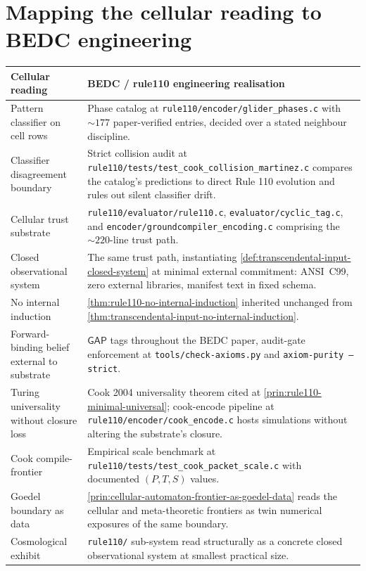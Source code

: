 \section{Mapping the cellular reading to BEDC engineering}
\label{sec:cellular-automaton-reading-mapping-engineering}

\begin{longtable}{p{}p{}}
\toprule
\textbf{Cellular reading} & \textbf{BEDC / rule110 engineering realisation} \\
\midrule
Pattern classifier on cell rows &
Phase catalog at \texttt{rule110/encoder/glider\_phases.c} with \(\sim\!177\) paper-verified entries, decided over a stated neighbour discipline. \\
\midrule
Classifier disagreement boundary &
Strict collision audit at \texttt{rule110/tests/test\_cook\_collision\_martinez.c} compares the catalog's predictions to direct Rule 110 evolution and rules out silent classifier drift. \\
\midrule
Cellular trust substrate &
\texttt{rule110/evaluator/rule110.c}, \texttt{evaluator/cyclic\_tag.c}, and \texttt{encoder/groundcompiler\_encoding.c} comprising the \(\sim\!220\)-line trust path. \\
\midrule
Closed observational system &
The same trust path, instantiating \autoref{def:transcendental-input-closed-system} at minimal external commitment: ANSI~C99, zero external libraries, manifest text in fixed schema. \\
\midrule
No internal induction &
\autoref{thm:rule110-no-internal-induction} inherited unchanged from \autoref{thm:transcendental-input-no-internal-induction}. \\
\midrule
Forward-binding belief external to substrate &
\(\mathsf{GAP}\) tags throughout the BEDC paper, audit-gate enforcement at \texttt{tools/check-axioms.py} and \texttt{axiom-purity --strict}. \\
\midrule
Turing universality without closure loss &
Cook 2004 universality theorem cited at \autoref{prin:rule110-minimal-universal}; cook-encode pipeline at \texttt{rule110/encoder/cook\_encode.c} hosts simulations without altering the substrate's closure. \\
\midrule
Cook compile-frontier &
Empirical scale benchmark at \texttt{rule110/tests/test\_cook\_packet\_scale.c} with documented \((P, T, S)\) values. \\
\midrule
Goedel boundary as data &
\autoref{prin:cellular-automaton-frontier-as-goedel-data} reads the cellular and meta-theoretic frontiers as twin numerical exposures of the same boundary. \\
\midrule
Cosmological exhibit &
\texttt{rule110/} sub-system read structurally as a concrete closed observational system at smallest practical size. \\
\bottomrule
\end{longtable}

